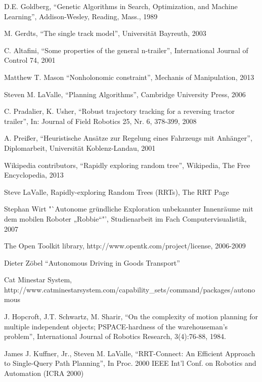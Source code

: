 \documentclass[m,bachelor,binding,oneside,palatino]{thesisdifctunl}
\begin{document}
\begin{thebibliography}{9}
	D.E. Goldberg,
	"`Genetic Algorithms in Search, Optimization, and Machine Learning"',
	Addison-Wesley, Reading, Mass.,
	1989
	
	M. Gerdts,
	"`The single track model"',
	Universität Bayreuth,
	2003
	
	C. Altafini,
	"`Some properties of the general n-trailer"',
	International Journal of Control 74,
	2001
	
	Matthew T. Mason
	"`Nonholonomic constraint"',
	Mechanis of Manipulation,
	2013
	
	Steven M. LaValle,
	"`Planning Algorithms"',
	Cambridge University Press,
	2006
	
	C. Pradalier, K. Usher,
	"`Robust trajectory tracking for a reversing tractor trailer"',
	In: Journal of Field Robotics 25, Nr. 6, 378-399,
	2008
	
	A. Preißer,
	"`Heuristische Ansätze zur Regelung eines Fahrzeugs mit Anhänger"',
	Diplomarbeit, Universität Koblenz-Landau,
	2001
	
	Wikipedia contributors,
	"`Rapidly exploring random tree"',
	Wikipedia, The Free Encyclopedia,
	2013
	
	Steve LaValle,
	Rapidly-exploring Random Trees (RRTs),
	The RRT Page

	Stephan Wirt
	"`Autonome gründliche Exploration unbekannter Innenräume mit dem mobilen Roboter „Robbie“"',
	Studienarbeit im Fach Computervisualistik,
	2007
	
	The Open Toolkit library,
	http://www.opentk.com/project/license,
	2006-2009
	
	Dieter Zöbel
	"`Autonomous Driving in Goods Transport"'
	
	Cat Minestar System,\\
	http://www.catminestarsystem.com/capability\_sets/command/packages/autonomous
	
	J. Hopcroft, J.T. Schwartz, M. Sharir,
	"`On the complexity of motion planning for multiple independent objects; PSPACE-hardness of the warehouseman's problem"',
	International Journal of Robotics Research, 3(4):76-88,
	1984.
	
	James J. Kuffner, Jr., Steven M. LaValle,
	"`RRT-Connect: An Eﬃcient Approach to Single-Query Path Planning"',
	In Proc. 2000 IEEE Int’l Conf. on Robotics and Automation (ICRA 2000)

\end{thebibliography}


\end{document}
